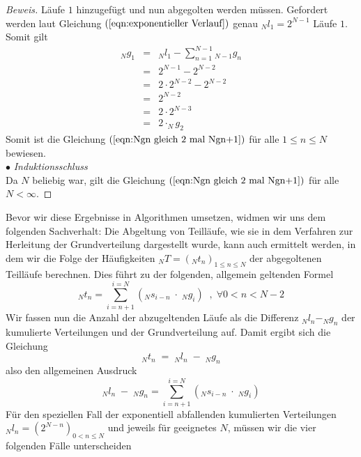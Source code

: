 \documentclass[11pt,oneside,a4paper]{scrreprt}
\newenvironment{bew}{\begin{proof}[Beweis]}{\end{proof}}
\begin{document}
\begin{bew}
Läufe $1$ hinzugefügt und nun abgegolten werden müssen. Gefordert werden laut Gleichung $(\ref{eqn:exponentieller Verlauf})$ genau $_{N}l_{1}=2^{N-1}$ Läufe $1$. Somit gilt
\begin{eqnarray}
_Ng_1 &=& _Nl_1-\sum_{n=1}^{N-1}{_{N-1}}g_n\\
&=& 2^{N-1}-2^{N-2}\\
&=&2 \cdot 2^{N-2}-2^{N-2}\\
&=&2^{N-2}\\
&=&2 \cdot 2^{N-3}\\
&=&2 \cdot _Ng_{2}
\end{eqnarray}
Somit ist die Gleichung $(\ref{eqn:Ngn gleich 2 mal Ngn+1})$ für alle $1\leq n\leq N$ bewiesen.\\
\indent $\bullet$ \emph{Induktionsschluss}\\
Da $N$ beliebig war, gilt die Gleichung $(\ref{eqn:Ngn gleich 2 mal Ngn+1})$ für alle $N<\infty$.
\end{bew}

Bevor wir diese Ergebnisse in Algorithmen umsetzen, widmen wir uns dem folgenden Sachverhalt: Die Abgeltung von Teilläufe, wie sie in dem Verfahren zur Herleitung der Grundverteilung dargestellt wurde, kann auch ermittelt werden, in dem wir die Folge der Häufigkeiten $_NT=(_Nt_n)_{1\leq n\leq N}$ der abgegoltenen Teilläufe berechnen. Dies führt zu der folgenden, allgemein geltenden Formel
\begin{equation}\label{eqn:Abgeltung der Teilläufe}
_Nt_n=\sum_{i=n+1}^{i=N}\left({_N}s_{i-n}\;\cdot\;_Ng_i\right)\;\;,\; \forall 0<n<N-2
\end{equation}
Wir fassen nun die Anzahl der abzugeltenden Läufe als die Differenz $_Nl_n-_Ng_n$ der kumulierte Verteilungen und der Grundverteilung auf. Damit ergibt sich die Gleichung
\begin{equation}
_Nt_n\;=\;_Nl_n\;-\;_Ng_n
\end{equation}
also den allgemeinen Ausdruck
\begin{equation}\label{eqn: abgegoltenen Teilläufe}
_Nl_n\;-\;_Ng_n=\sum_{i=n+1}^{i=N}\left({_N}s_{i-n}\;\cdot\;_Ng_i\right)
\end{equation}
Für den speziellen Fall der exponentiell abfallenden kumulierten Verteilungen $_Nl_n=(2^{N-n})_{0<n\leq N}$ und jeweils für geeignetes $N$, müssen wir die vier folgenden Fälle unterscheiden\\
\end{document}
